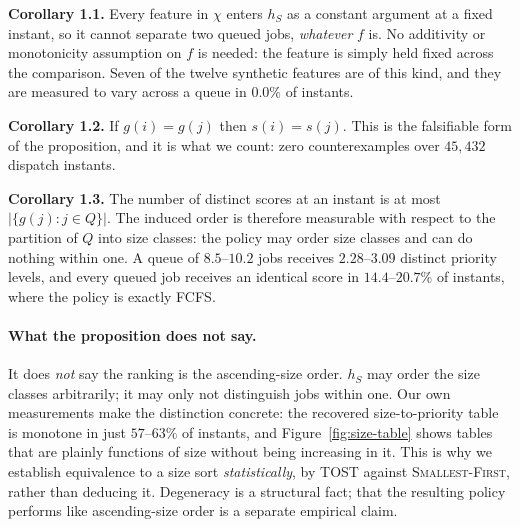 \documentclass[11pt,twocolumn]{article}
\begin{document}
\medskip
\noindent\textbf{Corollary 1.1.} Every feature in $\chi$ enters $h_S$ as a constant
argument at a fixed instant, so it cannot separate two queued jobs, \emph{whatever}
$f$ is. No additivity or monotonicity assumption on $f$ is needed: the feature is
simply held fixed across the comparison. Seven of the twelve synthetic features are
of this kind, and they are measured to vary across a queue in $0.0\%$ of instants.

\medskip
\noindent\textbf{Corollary 1.2.} If $g(i)=g(j)$ then $s(i)=s(j)$. This is the
falsifiable form of the proposition, and it is what we count: zero counterexamples
over $45{,}432$ dispatch instants.

\medskip
\noindent\textbf{Corollary 1.3.} The number of distinct scores at an instant is at
most $|\{g(j):j\in Q\}|$. The induced order is therefore measurable with respect to
the partition of $Q$ into size classes: the policy may order size classes and can do
nothing within one. A queue of $8.5$--$10.2$ jobs receives $2.28$--$3.09$ distinct
priority levels, and every queued job receives an identical score in
$14.4$--$20.7\%$ of instants, where the policy is exactly FCFS.

\paragraph{What the proposition does not say.}
It does \emph{not} say the ranking is the ascending-size order. $h_S$ may order the
size classes arbitrarily; it may only not distinguish jobs within one. Our own
measurements make the distinction concrete: the recovered size-to-priority table is
monotone in just $57$--$63\%$ of instants, and Figure~\ref{fig:size-table} shows
tables that are plainly functions of size without being increasing in it. This is why we establish equivalence to a
size sort \emph{statistically}, by TOST against \textsc{Smallest-First}, rather than
deducing it. Degeneracy is a structural fact; that the resulting policy performs like
ascending-size order is a separate empirical claim.
\end{document}
